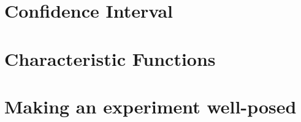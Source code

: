 \documentclass{article}
\begin{document}
\section{Confidence Interval}

\section{Characteristic Functions}

\section{Making an experiment well-posed}
\end{document}
